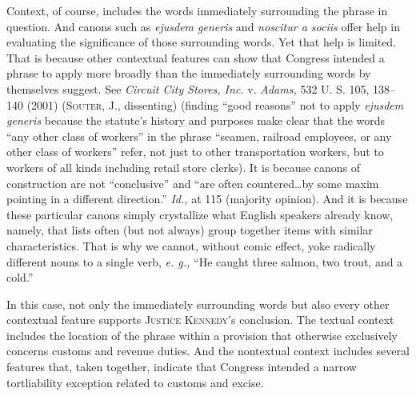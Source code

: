   Context, of course, includes the words immediately surrounding the phrase in question. And canons such as \emph{ejusdem generis} and \emph{noscitur a sociis} offer help in evaluating the significance of those surrounding words. Yet that help is limited. That is because other contextual features can show that Congress intended a phrase to apply more broadly than the immediately surrounding words by themselves suggest. See \emph{Circuit City Stores, Inc.} v. \emph{Adams,} 532 U. S. 105, 138--140 (2001) (\textsc{Souter,} J., dissenting) (finding ``good reasons'' not to apply \emph{ejusdem generis} because the statute's history and purposes make clear that the words ``any other class of workers'' in the phrase ``seamen, railroad employees, or any other class of workers'' refer, not just to other transportation workers, but to workers of all kinds including retail store clerks). It is because canons of construction are not ``conclusive'' and ``are often countered\dots by some maxim \newpage  pointing in a different direction.'' \emph{Id.,} at 115 (majority opinion). And it is because these particular canons simply crystallize what English speakers already know, namely, that lists often (but not always) group together items with similar characteristics. That is why we cannot, without comic effect, yoke radically different nouns to a single verb, \emph{e. g.,} ``He caught three salmon, two trout, and a cold.''

  In this case, not only the immediately surrounding words but also every other contextual feature supports \textsc{Justice Kennedy}'s conclusion. The textual context includes the location of the phrase within a provision that otherwise exclusively concerns customs and revenue duties. And the nontextual context includes several features that, taken together, indicate that Congress intended a narrow tortliability exception related to customs and excise.

